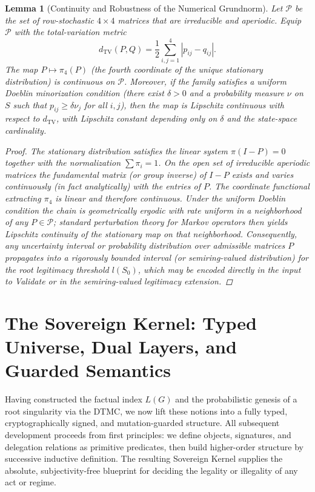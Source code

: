 \documentclass[11pt,a4paper]{article}
\newtheorem{lemma}[theorem]{Lemma}
\begin{document}
\begin{lemma}[Continuity and Robustness of the Numerical Grundnorm]
Let \(\mathcal{P}\) be the set of row-stochastic \(4\times 4\) matrices that are irreducible and aperiodic. Equip \(\mathcal{P}\) with the total-variation metric
\[
d_{\mathrm{TV}}(P,Q) = \frac12\sum_{i,j=1}^4 |p_{ij}-q_{ij}|.
\]
The map \(P\mapsto\pi_4(P)\) (the fourth coordinate of the unique stationary distribution) is continuous on \(\mathcal{P}\). Moreover, if the family satisfies a uniform Doeblin minorization condition (there exist \(\delta>0\) and a probability measure \(\nu\) on \(S\) such that \(p_{ij}\ge\delta\nu_j\) for all \(i,j\)), then the map is Lipschitz continuous with respect to \(d_{\mathrm{TV}}\), with Lipschitz constant depending only on \(\delta\) and the state-space cardinality.

\begin{proof}
The stationary distribution satisfies the linear system \(\pi(I-P)=0\) together with the normalization \(\sum\pi_i=1\). On the open set of irreducible aperiodic matrices the fundamental matrix (or group inverse) of \(I-P\) exists and varies continuously (in fact analytically) with the entries of \(P\). The coordinate functional extracting \(\pi_4\) is linear and therefore continuous. Under the uniform Doeblin condition the chain is geometrically ergodic with rate uniform in a neighborhood of any \(P\in\mathcal{P}\); standard perturbation theory for Markov operators then yields Lipschitz continuity of the stationary map on that neighborhood. Consequently, any uncertainty interval or probability distribution over admissible matrices \(P\) propagates into a rigorously bounded interval (or semiring-valued distribution) for the root legitimacy threshold \(l(S_0)\), which may be encoded directly in the input to Validate or in the semiring-valued legitimacy extension.
\end{proof}
\end{lemma}

\section{The Sovereign Kernel: Typed Universe, Dual Layers, and Guarded Semantics}

Having constructed the factual index \(L(G)\) and the probabilistic genesis of a root singularity via the DTMC, we now lift these notions into a fully typed, cryptographically signed, and mutation-guarded structure. All subsequent development proceeds from first principles: we define objects, signatures, and delegation relations as primitive predicates, then build higher-order structure by successive inductive definition. The resulting Sovereign Kernel supplies the absolute, subjectivity-free blueprint for deciding the legality or illegality of any act or regime.
\end{document}

